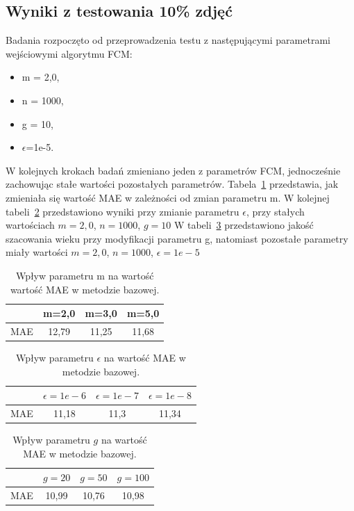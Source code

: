\documentclass[a4paper,twoside,12pt]{book}
\begin{document}
    \subsection*{Wyniki z testowania 10\% zdjęć}
    Badania rozpoczęto od przeprowadzenia testu z następującymi parametrami wejściowymi algorytmu FCM:
    \begin{itemize}
        \item m = 2,0,
        \item n = 1000,
        \item g = 10,
        \item $\epsilon$=1e-5.
    \end{itemize}
    W kolejnych krokach badań zmieniano jeden z parametrów FCM, jednocześnie zachowując stałe wartości pozostałych
    parametrów.
    Tabela~\ref{tab.bazowa_m} przedstawia, jak zmieniała się wartość MAE w zależności od zmian parametru m.
    W kolejnej tabeli~\ref{tab.bazowa_e} przedstawiono wyniki przy
    zmianie parametru $\epsilon$, przy stałych wartościach $m=2,0$, $n=1000$, $g=10$
    W tabeli~\ref{tab.bazowa_g} przedstawiono
    jakość szacowania
    wieku przy modyfikacji parametru g, natomiast pozostałe parametry miały wartości $m=2,0$, $n=1000$, $\epsilon=1e-5$
    \begin{table}[h!]
        \centering
        \caption{Wpływ parametru m na wartość wartość MAE w metodzie bazowej.}
        \begin{tabular}{|c|c|c|c|}
            \hline
            & m=2,0 & m=3,0 & m=5,0 \\ \hline
            MAE & 12,79 & 11,25 & 11,68 \\ \hline
        \end{tabular}
        \label{tab.bazowa_m}
    \end{table}
    \begin{table}[h!]
        \centering
        \caption{Wpływ parametru $\epsilon$ na wartość MAE w metodzie bazowej.}
        \begin{tabular}{|c|c|c|c|}
            \hline
            & $\epsilon=1e-6$ & $\epsilon=1e-7$ & $\epsilon=1e-8$ \\ \hline
            MAE & 11,18 & 11,3 & 11,34 \\ \hline
        \end{tabular}
        \label{tab.bazowa_e}
    \end{table}
    \begin{table}[h!]
        \centering
        \caption{Wpływ parametru $g$ na wartość MAE w metodzie bazowej.}
        \begin{tabular}{|c|c|c|c|}
            \hline
            & $g=20$ & $g=50$ & $g=100$ \\ \hline
            MAE & 10,99 & 10,76 & 10,98 \\ \hline
        \end{tabular}
        \label{tab.bazowa_g}
    \end{table}
\end{document}
